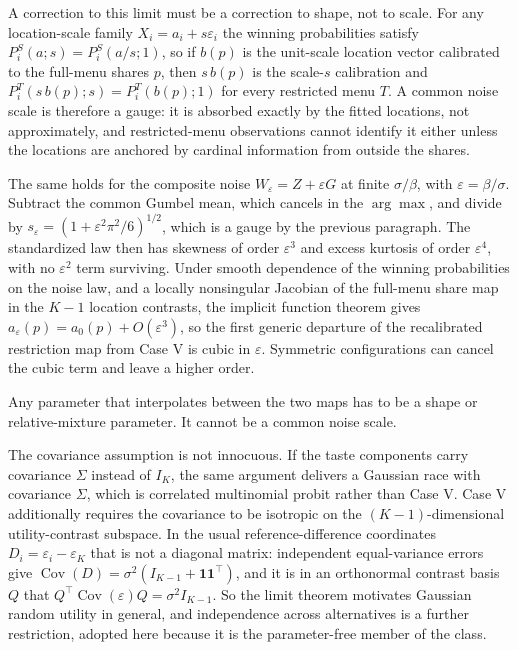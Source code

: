 \documentclass[11pt]{article}
\begin{document}
A correction to this limit must be a correction to shape, not to scale. For any
location-scale family $X_i = a_i + s\varepsilon_i$ the winning probabilities satisfy
$P^S_i(a;s) = P^S_i(a/s;1)$, so if $b(p)$ is the unit-scale location vector calibrated to the
full-menu shares $p$, then $s\,b(p)$ is the scale-$s$ calibration and
$P^T_i(s\,b(p);s) = P^T_i(b(p);1)$ for every restricted menu $T$. A common noise scale is
therefore a gauge: it is absorbed exactly by the fitted locations, not approximately, and restricted-menu
observations cannot identify it either unless the locations are anchored by cardinal
information from outside the shares.

The same holds for the composite noise $W_\varepsilon = Z + \varepsilon G$ at finite
$\sigma/\beta$, with $\varepsilon = \beta/\sigma$. Subtract the common Gumbel mean, which
cancels in the $\arg\max$, and divide by $s_\varepsilon = (1 + \varepsilon^2 \pi^2/6)^{1/2}$,
which is a gauge by the previous paragraph. The standardized law then has skewness of order
$\varepsilon^3$ and excess kurtosis of order $\varepsilon^4$, with no $\varepsilon^2$ term
surviving. Under smooth dependence of the winning probabilities on the noise law, and a
locally nonsingular Jacobian of the full-menu share map in the $K-1$ location contrasts, the
implicit function theorem gives $a_\varepsilon(p) = a_0(p) + O(\varepsilon^3)$, so the first
generic departure of the recalibrated restriction map from Case V is cubic in $\varepsilon$.
Symmetric configurations can cancel the cubic term and leave a higher order.

Any parameter that interpolates between the two maps has to be a shape or relative-mixture
parameter. It cannot be a common noise scale.

The covariance assumption is not innocuous. If the taste
components carry covariance $\Sigma$ instead of $I_K$, the same argument delivers a Gaussian
race with covariance $\Sigma$, which is correlated multinomial probit rather than Case V.
Case V additionally requires the covariance to be isotropic on the $(K-1)$-dimensional
utility-contrast subspace. In the usual reference-difference coordinates
$D_i = \varepsilon_i - \varepsilon_K$ that is not a diagonal matrix: independent equal-variance
errors give $\operatorname{Cov}(D) = \sigma^2(I_{K-1} + \mathbf{1}\mathbf{1}^{\top})$, and it is
in an orthonormal contrast basis $Q$ that $Q^{\top}\operatorname{Cov}(\varepsilon)Q =
\sigma^2 I_{K-1}$. So the limit
theorem motivates Gaussian random utility in general, and independence across alternatives
is a further restriction, adopted here because it is the parameter-free member of the class.
\end{document}
